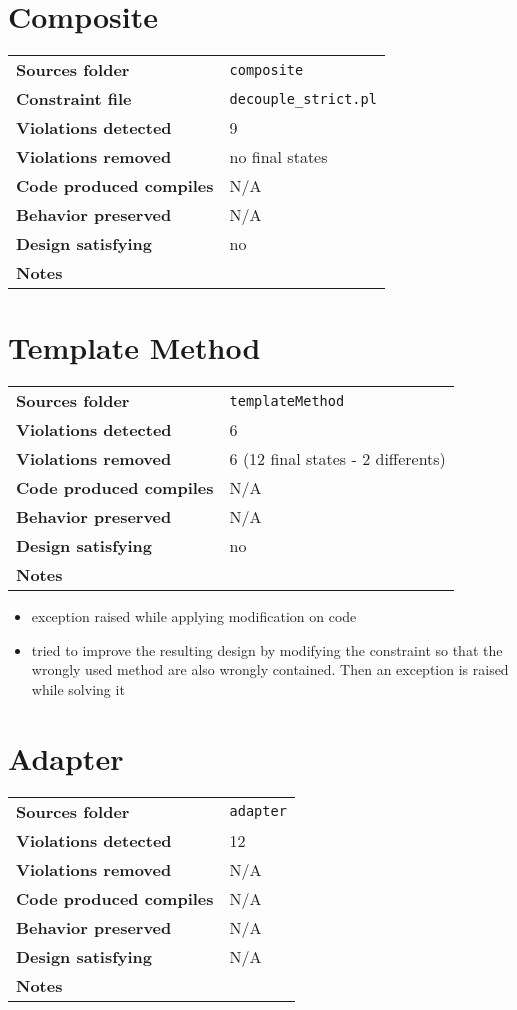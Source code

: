 \documentclass[french]{article}
\begin{document}
\section*{Composite}
\noindent\begin{tabular}{ l p{12cm} }
\textbf{Sources folder} &  \texttt{composite}\\
\textbf{Constraint file} & \texttt{decouple\_strict.pl} \\
\textbf{Violations detected} & 9\\
\textbf{Violations removed} & no final states\\
\textbf{Code produced compiles} & N/A\\
\textbf{Behavior preserved} & N/A\\
\textbf{Design satisfying} & no\\
\textbf{Notes} & \\
\end{tabular}

\section*{Template Method}
\noindent\begin{tabular}{ l p{12cm} }
\textbf{Sources folder} &  \texttt{templateMethod}\\
\textbf{Violations detected} & 6\\
\textbf{Violations removed} & 6 (12 final states - 2 differents)\\
\textbf{Code produced compiles} & N/A\\
\textbf{Behavior preserved} & N/A\\
\textbf{Design satisfying} & no\\
\textbf{Notes} & \\
\end{tabular}
\begin{itemize}
\item exception raised while applying modification on code
\item tried to improve the resulting design by modifying the constraint so that the wrongly used method are also wrongly contained. Then an exception is raised while solving it
\end{itemize}


\section*{Adapter}
\noindent\begin{tabular}{ l p{12cm} }
\textbf{Sources folder} &  \texttt{adapter}\\
\textbf{Violations detected} & 12\\
\textbf{Violations removed} & N/A\\
\textbf{Code produced compiles} & N/A\\
\textbf{Behavior preserved} & N/A \\
\textbf{Design satisfying} & N/A\\
\textbf{Notes} & \\
\end{tabular}
\end{document}
